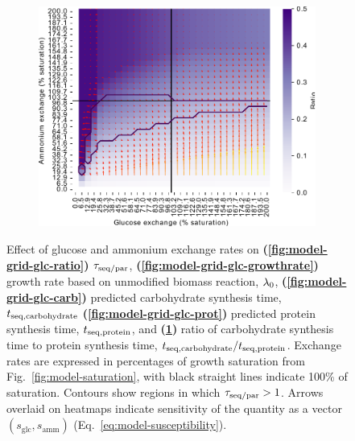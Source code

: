 \begin{figure}
  \begin{subfigure}[t]{0.45\textwidth}
  \centering
    \includegraphics[width=\linewidth]{ec_grid_glc_amm_carb_to_prot}
    \caption{
    }
    \label{fig:model-grid-glc-carb-to-prot}
  \end{subfigure}
  \caption[
    Effect of glucose and ammonium exchange rates
  ]{
    Effect of glucose and ammonium exchange rates on \textbf{(\ref{fig:model-grid-glc-ratio})} $\tau_{\mathrm{seq}/\mathrm{par}}$, \textbf{(\ref{fig:model-grid-glc-growthrate})} growth rate based on unmodified biomass reaction, $\lambda_{0}$, \textbf{(\ref{fig:model-grid-glc-carb})} predicted carbohydrate synthesis time, $t_{\mathrm{seq},\mathrm{carbohydrate}}$ \textbf{(\ref{fig:model-grid-glc-prot})} predicted protein synthesis time, $t_{\mathrm{seq},\mathrm{protein}}$, and \textbf{(\ref{fig:model-grid-glc-carb-to-prot})} ratio of carbohydrate synthesis time to protein synthesis time, $t_{\mathrm{seq},\mathrm{carbohydrate}}/t_{\mathrm{seq},\mathrm{protein}}$.
    Exchange rates are expressed in percentages of growth saturation from Fig.\ \ref{fig:model-saturation}, with black straight lines indicate 100\% of saturation.
    Contours show regions in which $\tau_{\mathrm{seq}/\mathrm{par}} > 1$.
    Arrows overlaid on heatmaps indicate sensitivity of the quantity as a vector $(s_{\mathrm{glc}}, s_{\mathrm{amm}})$ (Eq.\ \ref{eq:model-susceptibility}).
  }
  \label{fig:model-grid-glc}
\end{figure}

